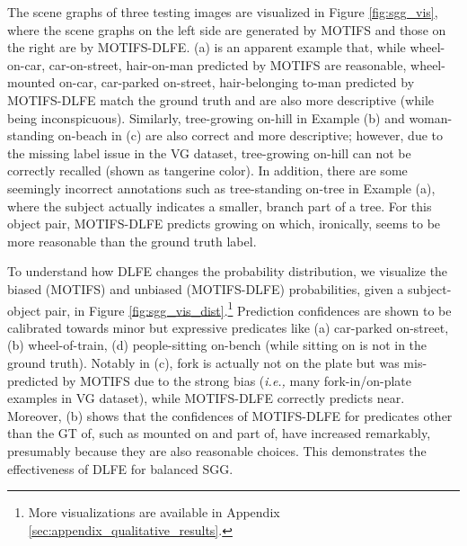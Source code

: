 \documentclass[sigconf]{acmart}
\begin{document}
The scene graphs of three testing images are visualized in Figure \ref{fig:sgg_vis}, where the scene graphs on the left side are generated by MOTIFS and those on the right are by MOTIFS-DLFE.
(a) is an apparent example that, while {\selectfont wheel-on-car}, {\selectfont car-on-street}, {\selectfont hair-on-man} predicted by MOTIFS are reasonable, {\selectfont wheel-mounted on-car}, {\selectfont car-parked on-street}, {\selectfont hair-belonging to-man} predicted by MOTIFS-DLFE match the ground truth and are also more descriptive (while being inconspicuous).
Similarly, {\selectfont tree-growing on-hill} in Example (b) and {\selectfont woman-standing on-beach} in (c) are also correct and more descriptive; however, due to the missing label issue in the VG dataset, {\selectfont tree-growing on-hill} can not be correctly recalled (shown as tangerine color).
In addition, there are some seemingly incorrect annotations such as {\selectfont tree-standing on-tree} in Example (a), where the subject actually indicates a smaller, branch part of a tree.
For this object pair, MOTIFS-DLFE predicts {\selectfont growing on} which, ironically, seems to be more reasonable than the ground truth label.

To understand how DLFE changes the probability distribution, we visualize the biased (MOTIFS) and unbiased (MOTIFS-DLFE) probabilities, given a subject-object pair, in Figure \ref{fig:sgg_vis_dist}.\footnote{More visualizations are available in Appendix \ref{sec:appendix_qualitative_results}.}
Prediction confidences are shown to be calibrated towards minor but expressive predicates like (a) {\selectfont car-parked on-street}, (b) {\selectfont wheel-of-train}, (d) {\selectfont people-sitting on-bench} (while {\selectfont sitting on} is not in the ground truth).
Notably in (c), {\selectfont fork} is actually not {\selectfont on} the plate but was mis-predicted by MOTIFS due to the strong bias (\emph{i.e.,} many {\selectfont fork-in/on-plate} examples in VG dataset), while MOTIFS-DLFE correctly predicts {\selectfont near}.
Moreover, (b) shows that the confidences of MOTIFS-DLFE for predicates other than the GT {\selectfont of}, such as {\selectfont mounted on} and {\selectfont part of}, have increased remarkably, presumably because they are also reasonable choices.
This demonstrates the effectiveness of DLFE for balanced SGG.
\end{document}
